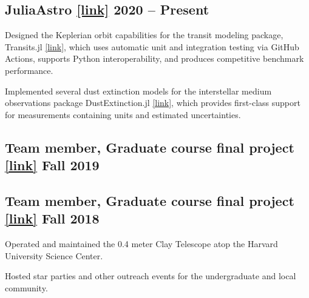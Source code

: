 \subsection[A]{JuliaAstro \href{https://juliaastro.github.io/dev/index.html}{[link]} \hfill 2020 -- Present}
\begin{zitemize}
\item Designed the Keplerian orbit capabilities for the transit modeling package, Transits.jl \href{https://juliaastro.github.io/Transits.jl/dev/}{[link]}, which uses automatic unit and integration testing via GitHub Actions, supports Python interoperability, and produces competitive benchmark performance.
\item Implemented several dust extinction models for the interstellar medium observations package DustExtinction.jl \href{https://juliaastro.github.io/DustExtinction.jl/stable/}{[link]}, which provides first-class support for measurements containing units and estimated uncertainties.
\end{zitemize}

\subsection[B]{Team member, Graduate course final project \href{https://github.com/icweaver/pyhat}{[link]} \hfill Fall 2019}
\begin{zitemize}
\item 
\end{zitemize}

\subsection[C]{Team member, Graduate course final project \href{https://spacejam.readthedocs.io/en/latest/}{[link]} \hfill Fall 2018}
\begin{zitemize}
\item Operated and maintained the 0.4 meter Clay Telescope atop the Harvard University Science Center.
\item Hosted star parties and other outreach events for the undergraduate and local community.
\end{zitemize}